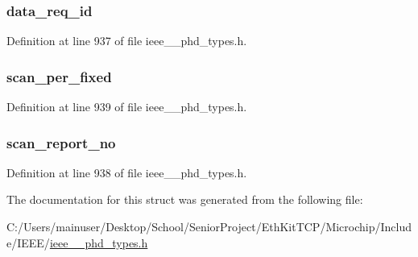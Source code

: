 \subsubsection[{data\+\_\+req\+\_\+id}]{ data\+\_\+req\+\_\+id}\label{struct___scan_report_info_m_p_fixed_a1c786af4096ed61c5f6cfdf27f317b70}


Definition at line 937 of file ieee\+\_\+\_\+phd\+\_\+types.\+h.

\hypertarget{struct___scan_report_info_m_p_fixed_a5979420a126b9179d0a1ca768cf7361e}{}
\subsubsection[{scan\+\_\+per\+\_\+fixed}]{ scan\+\_\+per\+\_\+fixed}\label{struct___scan_report_info_m_p_fixed_a5979420a126b9179d0a1ca768cf7361e}


Definition at line 939 of file ieee\+\_\+\_\+phd\+\_\+types.\+h.

\hypertarget{struct___scan_report_info_m_p_fixed_a21f75132869d4d200ffe01d91b4736d8}{}
\subsubsection[{scan\+\_\+report\+\_\+no}]{ scan\+\_\+report\+\_\+no}\label{struct___scan_report_info_m_p_fixed_a21f75132869d4d200ffe01d91b4736d8}


Definition at line 938 of file ieee\+\_\+\_\+phd\+\_\+types.\+h.



The documentation for this struct was generated from the following file\+:\begin{DoxyCompactItemize}
\item 
C\+:/\+Users/mainuser/\+Desktop/\+School/\+Senior\+Project/\+Eth\+Kit\+T\+C\+P/\+Microchip/\+Include/\+I\+E\+E\+E/\hyperlink{ieee__11073__phd__types_8h}{ieee\+\_\+\_\+phd\+\_\+types.\+h}\end{DoxyCompactItemize}
